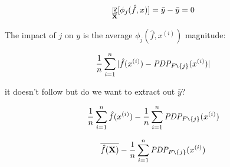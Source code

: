 \documentclass[11pt]{article}
\newcommand{\cut}[1]{}
\newcommand{\todo}[1]{{{\small\color{red}{[#1]}}}}
\DeclareMathOperator{\Ex}{\mathbb{E}}
\begin{document}
{\[
\Ex_{\bf X}[ \phi_j(\hat{f},x) ] = \bar{y} - \bar{y} = 0
\] 

\todo{ it makes sense that the expected value of the Shapley curve is 0 but I'm not sure that proves it's a mean centered PDP. lots of things could equal zero.}


The impact of $j$ on $y$ is the average $\phi_j(\hat{f},x^{(i)})$ magnitude:

\[
\frac{1}{n} \sum_{i=1}^n |  \hat{f}(x^{(i)}) - \text{\it PDP}_{F \texttt{\char`\\} \{j\}}(x^{(i)}) |
\]

 it doesn't follow but do we want to extract out $\bar{y}$?
 
\[
\frac{1}{n} \sum_{i=1}^n \hat{f}(x^{(i)}) - \frac{1}{n} \sum_{i=1}^n \text{\it PDP}_{F \texttt{\char`\\} \{j\}}(x^{(i)})
\]

\[
\overline{\hat{f}({\bf X})} - \frac{1}{n} \sum_{i=1}^n \text{\it PDP}_{F \texttt{\char`\\} \{j\}}(x^{(i)})
\]
}


\cut{
\noindent since $S = F \texttt{\char`\\} \{j\}$:

\[
\phi_j(\hat{f},x) = \frac{1}{p}\
 [ \Ex[\hat{f}(x_F,{\bf X}_\emptyset)] - \Ex[\hat{f}(x_{F \texttt{\char`\\} \{j\}},{\bf X}_{j})] ]
\]

Janzing says ``We now want to attribute the difference between f(x) and the expectation E[f(X)] to individual features.''


The code in {\tt\small bruteforce.py}\footnote{\tt https://github.com/slundberg/shap/blob/master/shap/explainers/bruteforce.py} has a simple but inefficient implementation that computes $\phi$ values using  {\tt\small f\_without\_j}, which is $PDP_S(x)$ ($i$ changed to $j$ to be consistent with our notation):

{\small
\begin{verbatim}
masker = lambda x, mask: x * mask + masker_data * np.invert(mask)
mask[list(S)] = 1
f_without_j = f(masker(x, mask)).mean(0)
mask[j] = 1
f_with_j = f(masker(x, mask)).mean(0)
phi[j,:] += weight * (f_with_j - f_without_j)
\end{verbatim}}

}
\end{document}
